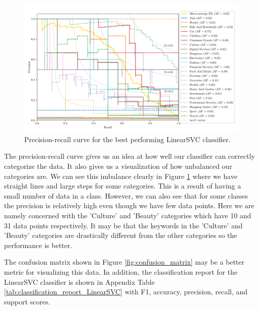 \begin{figure}[ht]
  \centering
  \includegraphics[width=\textwidth]{../img/plot_pr_curve.pdf}
  \caption{Precision-recall curve for the best performing LinearSVC classifier.}
  \label{fig:pr_curve}
\end{figure}

The precision-recall curve gives us an idea at how well our classifier can correctly categorize the data. It also gives us a visualization of how unbalanced our categories are. We can see this imbalance clearly in Figure \ref{fig:pr_curve} where we have straight lines and large steps for some categories. This is a result of having a small number of data in a class. However, we can also see that for some classes the precision is relatively high even though we have few data points. Here we are namely concerned with the 'Culture' and 'Beauty' categories which have 10 and 31 data points respectively. It may be that the keywords in the 'Culture' and 'Beauty' categories are drastically different from the other categories so the performance is better. 

The confusion matrix shown in Figure \ref{fig:confusion_matrix} may be a better metric for visualizing this data. In addition, the classification report for the LinearSVC classifier is shown in Appendix Table \ref{tab:classification_report_LinearSVC} with F1, accuracy, precision, recall, and support scores.

